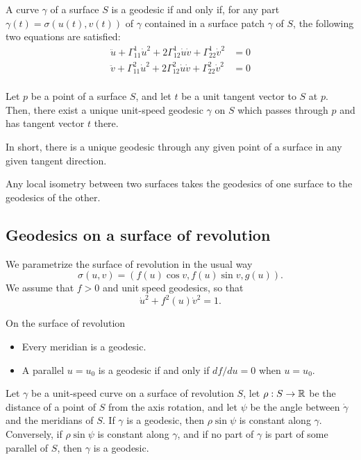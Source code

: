 \begin{proposition}
  A curve $\gamma$ of a surface $S$ is a geodesic if and only if,
  for any part $\gamma(t) = \sigma(u(t), v(t))$ of $\gamma$ contained
  in a surface patch $\gamma$ of $S$, the following two equations are satisfied:
  \begin{align*}
    \ddot{u} + \Gamma_{11}^1 \dot{u}^2 + 2 \Gamma_{12}^1 \dot{u}\dot{v} + \Gamma_{22}^1 \dot{v}^2 &= 0\\
    \ddot{v} + \Gamma_{11}^2 \dot{u}^2 + 2 \Gamma_{12}^2 \dot{u}\dot{v} + \Gamma_{22}^2 \dot{v}^2 &= 0\\
  \end{align*}
\end{proposition}

\begin{proposition}
  Let $p$ be a point of a surface $S$, and let $t$ be a unit tangent vector
  to $S$ at $p$. Then, there exist a unique unit-speed geodesic $\gamma$ on $S$ which
  passes through $p$ and has tangent vector $t$ there.
\end{proposition}

In short, there is a unique geodesic through any given point of a surface in any given tangent direction.

\begin{corollary}
  Any local isometry between two surfaces takes the geodesics of one surface to the geodesics of the other.
\end{corollary}

\subsection{Geodesics on a surface of revolution}

We parametrize the surface of revolution in the usual way
\[
  \sigma(u, v) = (f(u) \cos v, f(u) \sin v, g(u)).
\]
We assume that $f > 0$ and unit speed geodesics, so that
\[
  \dot{u}^2 + f^2(u) \dot{v}^2 = 1.
\]

\begin{proposition}
  On the surface of revolution
  \begin{itemize}
    \item Every meridian is a geodesic.
    \item A parallel $u = u_0$ is a geodesic if and only if $df / du = 0$ when $u = u_0$.
  \end{itemize}
\end{proposition}

\begin{theorem}
  Let $\gamma$ be a unit-speed curve on a surface of revolution $S$,
  let $\rho: S \to \mathbb{R}$ be the distance of a point of $S$ from the axis rotation,
  and let $\psi$ be the angle between $\dot{\gamma}$ and the meridians of $S$.
  If $\gamma$ is a geodesic, then $\rho \sin \psi$ is constant along $\gamma$.
  Conversely, if $\rho \sin \psi$ is constant along $\gamma$, and
  if no part of $\gamma$ is part of some parallel of $S$, then
  $\gamma$ is a geodesic.
\end{theorem}